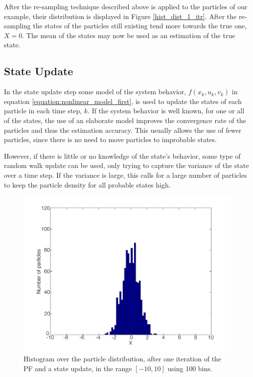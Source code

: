 \documentclass{LTHthesis}
\begin{document}
After the re-sampling technique described above is applied to the particles of our example, their distribution is displayed in Figure \ref{hist_dist_1_itr}. After the re-sampling the states of the particles still existing tend more towards the true one, $X=0$. The mean of the states may now be used as an estimation of the true state.    
% 
\subsection{State Update}
%
In the state update step some model of the system behavior, $f(x_k,u_k,v_k)$ in equation \ref{equation:nonlinear_model_first}, is used to update the states of each particle in each time step, $k$. If the system behavior is well known, for one or all of the states, the use  of an elaborate model improves the convergence rate of the particles and thus the estimation accuracy. This usually allows the use of fewer particles, since there is no need to move particles to improbable states.

However, if there is little or no knowledge of the state's behavior, some type of random walk update can be used, only trying to capture the variance of the state over a time step. If the variance is large, this calls for a large number of particles to keep the particle density for all probable states high. 
%
\begin{figure}[!hbt]

\includegraphics[width=1\textwidth ]{images/PF/hist_dist_1_itr_dyn}
\caption{Histogram over the particle distribution, after one iteration of the PF and a state update, in the range $[-10,10]$ using 100 bins.}\label{hist_dist_1_itr_dyn}
\end{figure}
\end{document}
